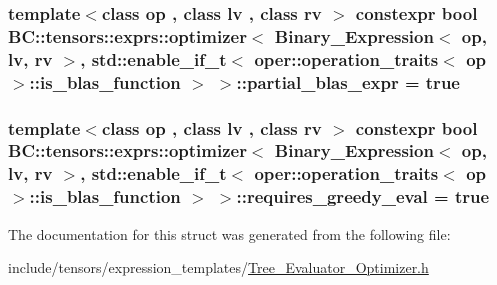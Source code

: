 \subsubsection[{\texorpdfstring{partial\+\_\+blas\+\_\+expr}{partial_blas_expr}}]{\setlength{\rightskip}{0pt plus 5cm}template$<$class op , class lv , class rv $>$ constexpr bool {\bf B\+C\+::tensors\+::exprs\+::optimizer}$<$ {\bf Binary\+\_\+\+Expression}$<$ op, lv, rv $>$, std\+::enable\+\_\+if\+\_\+t$<$ {\bf oper\+::operation\+\_\+traits}$<$ op $>$\+::is\+\_\+blas\+\_\+function $>$ $>$\+::partial\+\_\+blas\+\_\+expr = true\hspace{0.3cm}{\ttfamily [static]}}\hypertarget{structBC_1_1tensors_1_1exprs_1_1optimizer_3_01Binary__Expression_3_01op_00_01lv_00_01rv_01_4_00_183e68db6823926ca0c2e82552c93f0f_aecf22f6a0bb903c6e87594334fa7597d}{}\label{structBC_1_1tensors_1_1exprs_1_1optimizer_3_01Binary__Expression_3_01op_00_01lv_00_01rv_01_4_00_183e68db6823926ca0c2e82552c93f0f_aecf22f6a0bb903c6e87594334fa7597d}
\subsubsection[{\texorpdfstring{requires\+\_\+greedy\+\_\+eval}{requires_greedy_eval}}]{\setlength{\rightskip}{0pt plus 5cm}template$<$class op , class lv , class rv $>$ constexpr bool {\bf B\+C\+::tensors\+::exprs\+::optimizer}$<$ {\bf Binary\+\_\+\+Expression}$<$ op, lv, rv $>$, std\+::enable\+\_\+if\+\_\+t$<$ {\bf oper\+::operation\+\_\+traits}$<$ op $>$\+::is\+\_\+blas\+\_\+function $>$ $>$\+::requires\+\_\+greedy\+\_\+eval = true\hspace{0.3cm}{\ttfamily [static]}}\hypertarget{structBC_1_1tensors_1_1exprs_1_1optimizer_3_01Binary__Expression_3_01op_00_01lv_00_01rv_01_4_00_183e68db6823926ca0c2e82552c93f0f_a3b27e84b1853205433046be845e3c227}{}\label{structBC_1_1tensors_1_1exprs_1_1optimizer_3_01Binary__Expression_3_01op_00_01lv_00_01rv_01_4_00_183e68db6823926ca0c2e82552c93f0f_a3b27e84b1853205433046be845e3c227}


The documentation for this struct was generated from the following file\+:\begin{DoxyCompactItemize}
\item 
include/tensors/expression\+\_\+templates/\hyperlink{Tree__Evaluator__Optimizer_8h}{Tree\+\_\+\+Evaluator\+\_\+\+Optimizer.\+h}\end{DoxyCompactItemize}
